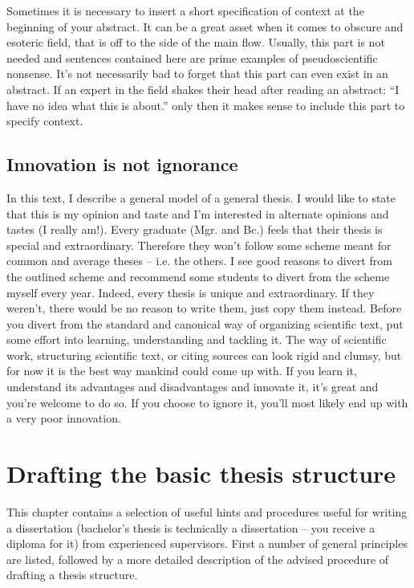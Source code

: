 Sometimes it is necessary to insert a short specification of context at the beginning of your abstract. It can be a great asset when it comes to obscure and esoteric field, that is off to the side of the main flow. Usually, this part is not needed and sentences contained here are prime examples of pseudoscientific nonsense. It's not necessarily bad to forget that this part can even exist in an abstract. If an expert in the field shakes their head after reading an abstract: ``I have no idea what this is about.'' only then it makes sense to include this part to specify context.


\section{Innovation is not ignorance}

In this text, I describe a general model of a general thesis. I would like to state that this is my opinion and taste and I'm interested in alternate opinions and tastes (I really am!). Every graduate (Mgr. and Bc.) feels that their thesis is special and extraordinary. Therefore they won't follow some scheme meant for common and average theses -- i.e. the others. I see good reasons to divert from the outlined scheme and recommend some students to divert from the scheme myself every year. Indeed, every thesis is unique and extraordinary. If they weren't, there would be no reason to write them, just copy them instead. Before you divert from the standard and canonical way of organizing scientific text, put some effort into learning, understanding and tackling it. The way of scientific work, structuring scientific text, or citing sources can look rigid and clumsy, but for now it is the best way mankind could come up with. If you learn it, understand its advantages and disadvantages and innovate it, it's great and you're welcome to do so. If you choose to ignore it, you'll most likely end up with a very poor innovation.

\chapter{Drafting the basic thesis structure}
\label{struktura}

This chapter contains a selection of useful hints and procedures useful for writing a dissertation (bachelor's thesis is technically a dissertation -- you receive a diploma for it) from experienced supervisors. First a number of general principles are listed, followed by a more detailed description of the advised procedure of drafting a thesis structure.

